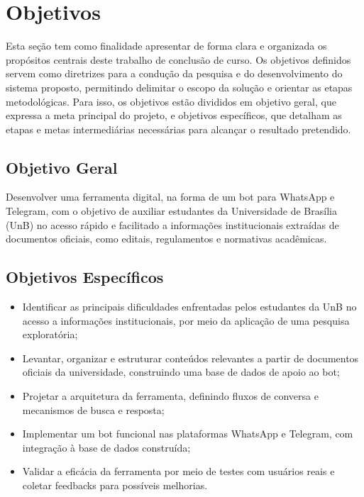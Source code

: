 \section{Objetivos}

Esta seção tem como finalidade apresentar de forma clara e organizada os propósitos centrais deste trabalho de conclusão de curso. Os objetivos definidos servem como diretrizes para a condução da pesquisa e do desenvolvimento do sistema proposto, permitindo delimitar o escopo da solução e orientar as etapas metodológicas. Para isso, os objetivos estão divididos em objetivo geral, que expressa a meta principal do projeto, e objetivos específicos, que detalham as etapas e metas intermediárias necessárias para alcançar o resultado pretendido.

\subsection{Objetivo Geral}

Desenvolver uma ferramenta digital, na forma de um bot para WhatsApp e Telegram, com o objetivo de auxiliar estudantes da Universidade de Brasília (UnB) no acesso rápido e facilitado a informações institucionais extraídas de documentos oficiais, como editais, regulamentos e normativas acadêmicas.

\subsection{Objetivos Específicos}

\begin{itemize}
    \item Identificar as principais dificuldades enfrentadas pelos estudantes da UnB no acesso a informações institucionais, por meio da aplicação de uma pesquisa exploratória;
    
    \item Levantar, organizar e estruturar conteúdos relevantes a partir de documentos oficiais da universidade, construindo uma base de dados de apoio ao bot;
    
    \item Projetar a arquitetura da ferramenta, definindo fluxos de conversa e mecanismos de busca e resposta;
    
    \item Implementar um bot funcional nas plataformas WhatsApp e Telegram, com integração à base de dados construída;
    
    \item Validar a eficácia da ferramenta por meio de testes com usuários reais e coletar feedbacks para possíveis melhorias.
\end{itemize}

